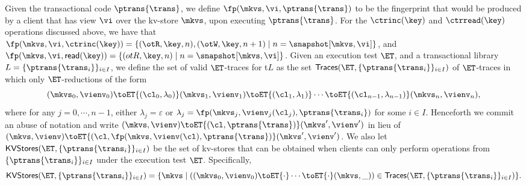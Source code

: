 Given the transactional code 
$\ptrans{\trans}$, we define $\fp(\mkvs, \vi, \ptrans{\trans})$ 
to be the fingerprint that would be produced by a client that has view $\vi$ 
over the kv-store $\mkvs$, upon executing $\ptrans{\trans}$.
For the $\ctrinc(\key)$ and $\ctrread(\key)$ operations discussed above, 
we have that 
$\fp(\mkvs, \vi, \ctrinc(\key)) = \{(\otR, \key, n), (\otW, \key, n+1) \mid 
n = \snapshot[\mkvs, \vi]\}$, and $\fp(\mkvs, \vi ,\mathsf{read}(\key)) = 
\{(otR, \key, n) \mid n = \snapshot[\mkvs, \vi]\}$.
Given an execution test $\ET$, and a transactional library $L = \{\ptrans{\trans_i}\}_{i \in I}$, 
we define the set of valid $\ET$-traces for t$L$ as the set 
$\mathsf{Traces}(\ET, \{\ptrans{\trans_i}\}_{i \in I})$ 
of $\ET$-traces in which only $\ET$-reductions of the form 
\[
(\mkvs_{0}, \vienv_{0}) \toET{(\cl_0, \lambda_0)} (\mkvs_{1}, \vienv_{1}) \toET{(\cl_1, \lambda_1)} \cdots 
\toET{(\cl_{n-1}, \lambda_{n-1})} (\mkvs_{n}, \vienv_{n}),
\]
where for any $j=0,\cdots,n-1$, either $\lambda_{j} = \varepsilon$ or $\lambda_{j} = \fp(\mkvs_{j}, \vienv_{j}(\cl_{j}), \ptrans{\trans_{i}})$ 
for some $i \in I$. Henceforth we commit an abuse of notation and write $(\mkvs, \vienv) \toET{(\cl, \ptrans{\trans})} (\mkvs', \vienv')$ 
in lieu of $(\mkvs, \vienv) \toET{(\cl, \fp(\mkvs,\vienv(\cl), \ptrans{\trans})} (\mkvs', \vienv')$.
We also let $\mathsf{KVStores}(\ET, \{\ptrans{\trans_i}\}_{i \in I})$ be the set of kv-stores 
that can be obtained when clients can only perform operations from $\{\ptrans{\trans_i}\}_{i \in I}$ 
under the execution test $\ET$. Specifically, 
\[
\mathsf{KVStores}(\ET, \{\ptrans{\trans_i}\}_{i \in I}) = \{ \mkvs \mid \left( (\mkvs_0, \vienv_{0}) \toET{\cdot} \cdots 
\toET{\cdot} (\mkvs, \_)\right) \in \mathsf{Traces}(\ET, \{\ptrans{\trans_{i}}\}_{i \in I}) \}.
\]

